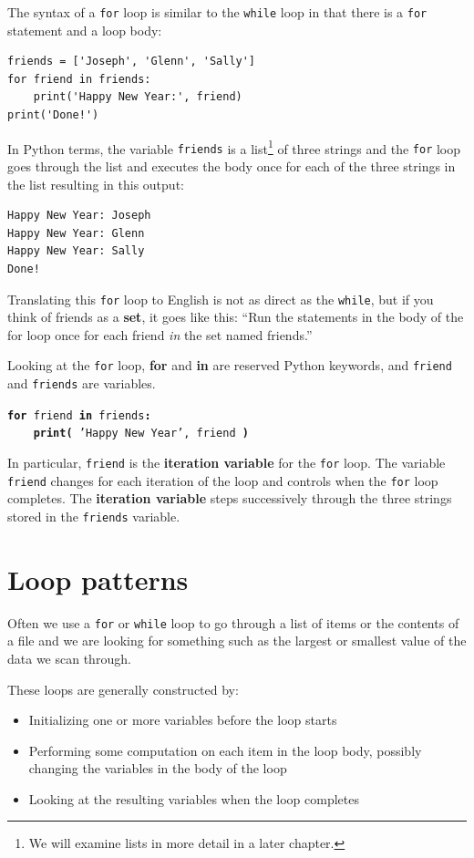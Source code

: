 The syntax of a {\tt for} loop is similar to the {\tt while} loop
in that there is a {\tt for} statement and a loop body:

\beforeverb
\begin{verbatim}
friends = ['Joseph', 'Glenn', 'Sally']
for friend in friends:
    print('Happy New Year:', friend)
print('Done!')
\end{verbatim}
\afterverb
%
In Python terms, 
the variable {\tt friends} is a list\footnote{We will 
examine lists in more detail in a later chapter.} 
of three strings and the {\tt for}
loop goes through the list and executes the body once
for each of the three strings in the list resulting in this output:

\beforeverb
\begin{verbatim}
Happy New Year: Joseph
Happy New Year: Glenn
Happy New Year: Sally
Done!
\end{verbatim}
\afterverb
%

Translating this {\tt for} loop to English is not as direct as the 
{\tt while}, but if you think of friends as a {\bf set},
it goes like this: ``Run the statements in the body of the 
for loop once for each friend \emph{in} the set named friends.''

Looking at the {\tt for} loop, {\bf for} and {\bf in} are reserved
Python keywords, and {\tt friend} and {\tt friends} are variables.

{\tt {\bf for} friend {\bf in} friends{\bf :}\\
\verb"    "{\bf print(} 'Happy New Year', friend {\bf )}}

In particular, {\tt friend} is the {\bf iteration variable} for 
the {\tt for} loop.  The variable {\tt friend} changes for each iteration of
the loop and controls when the {\tt for} loop completes.  The 
{\bf iteration variable} steps successively through the 
three strings stored in the {\tt friends} variable.


\section{Loop patterns}

Often we use a {\tt for} or {\tt while} loop to go through a list of items
or the contents of a file and we are looking for something such as
the largest or smallest value of the data we scan through.

These loops are generally constructed by:

\begin{itemize}

\item Initializing one or more variables before the loop starts

\item Performing some computation on each item in the loop body, 
possibly changing the variables in the body of the loop

\item Looking at the resulting variables when the loop completes

\end{itemize}

